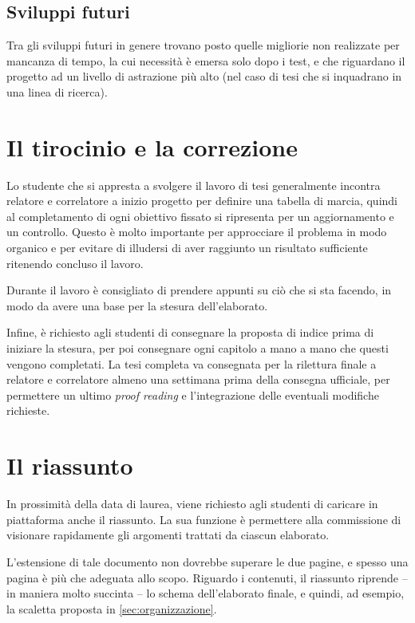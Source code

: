 \documentclass[12pt,italian]{report}
\begin{document}
\section{Sviluppi futuri}

Tra gli sviluppi futuri in genere trovano posto quelle migliorie non realizzate per mancanza di tempo, la cui necessità è emersa solo dopo i test, e che riguardano il progetto ad un livello di astrazione più alto (nel caso di tesi che si inquadrano in una linea di ricerca).


% 
% 

\appendix

\chapter{Il tirocinio e la correzione}

Lo studente che si appresta a svolgere il lavoro di tesi generalmente incontra relatore e correlatore a inizio progetto per definire una tabella di marcia, quindi al completamento di ogni obiettivo fissato si ripresenta per un aggiornamento e un controllo. Questo è molto importante per approcciare il problema in modo organico e per evitare di illudersi di aver raggiunto un risultato sufficiente ritenendo concluso il lavoro.

Durante il lavoro è consigliato di prendere appunti su ciò che si sta facendo, in modo da avere una base per la stesura dell'elaborato.

Infine, è richiesto agli studenti di consegnare la proposta di indice prima di iniziare la stesura, per poi consegnare ogni capitolo a mano a mano che questi vengono completati. La tesi completa va consegnata per la rilettura finale a relatore e correlatore almeno una settimana prima della consegna ufficiale, per permettere un ultimo \textit{proof reading} e l'integrazione delle eventuali modifiche richieste.

\chapter{Il riassunto}

In prossimità della data di laurea, viene richiesto agli studenti di caricare in piattaforma anche il riassunto. La sua funzione è permettere alla commissione di visionare rapidamente gli argomenti trattati da ciascun elaborato.

L'estensione di tale documento non dovrebbe superare le due pagine, e spesso una pagina è più che adeguata allo scopo. Riguardo i contenuti, il riassunto riprende -- in maniera molto succinta -- lo schema dell'elaborato finale, e quindi, ad esempio, la scaletta proposta in \ref{sec:organizzazione}.
\end{document}
